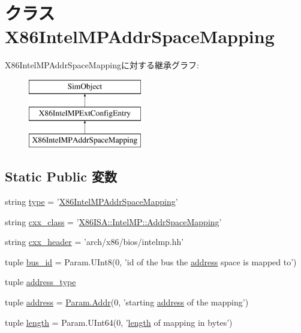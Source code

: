 \hypertarget{classIntelMP_1_1X86IntelMPAddrSpaceMapping}{
\section{クラス X86IntelMPAddrSpaceMapping}
\label{classIntelMP_1_1X86IntelMPAddrSpaceMapping}
}
X86IntelMPAddrSpaceMappingに対する継承グラフ:\begin{figure}[H]
\begin{center}
\leavevmode
\includegraphics[height=3cm]{classIntelMP_1_1X86IntelMPAddrSpaceMapping}
\end{center}
\end{figure}
\subsection*{Static Public 変数}
\begin{DoxyCompactItemize}
\item 
string \hyperlink{classIntelMP_1_1X86IntelMPAddrSpaceMapping_acce15679d830831b0bbe8ebc2a60b2ca}{type} = '\hyperlink{classIntelMP_1_1X86IntelMPAddrSpaceMapping}{X86IntelMPAddrSpaceMapping}'
\item 
string \hyperlink{classIntelMP_1_1X86IntelMPAddrSpaceMapping_a58cd55cd4023648e138237cfc0822ae3}{cxx\_\-class} = '\hyperlink{classX86ISA_1_1IntelMP_1_1AddrSpaceMapping}{X86ISA::IntelMP::AddrSpaceMapping}'
\item 
string \hyperlink{classIntelMP_1_1X86IntelMPAddrSpaceMapping_a17da7064bc5c518791f0c891eff05fda}{cxx\_\-header} = 'arch/x86/bios/intelmp.hh'
\item 
tuple \hyperlink{classIntelMP_1_1X86IntelMPAddrSpaceMapping_a6e34d01145c4deea78b58e36f0a7e81b}{bus\_\-id} = Param.UInt8(0, 'id of the bus the \hyperlink{classIntelMP_1_1X86IntelMPAddrSpaceMapping_a8c6c97c073c5563f4af9547714a7652c}{address} space is mapped to')
\item 
tuple \hyperlink{classIntelMP_1_1X86IntelMPAddrSpaceMapping_af94a82286d50e2f918f75e168e7db106}{address\_\-type}
\item 
tuple \hyperlink{classIntelMP_1_1X86IntelMPAddrSpaceMapping_a8c6c97c073c5563f4af9547714a7652c}{address} = \hyperlink{base_2types_8hh_af1bb03d6a4ee096394a6749f0a169232}{Param.Addr}(0, 'starting \hyperlink{classIntelMP_1_1X86IntelMPAddrSpaceMapping_a8c6c97c073c5563f4af9547714a7652c}{address} of the mapping')
\item 
tuple \hyperlink{classIntelMP_1_1X86IntelMPAddrSpaceMapping_a8c426fb385e90544414050b427d7426d}{length} = Param.UInt64(0, '\hyperlink{classIntelMP_1_1X86IntelMPAddrSpaceMapping_a8c426fb385e90544414050b427d7426d}{length} of mapping in bytes')
\end{DoxyCompactItemize}


